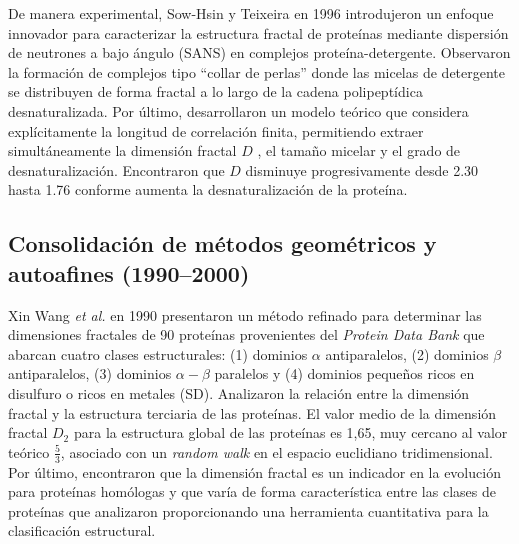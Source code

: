 De manera experimental, Sow-Hsin y Teixeira \cite{Chen1986} en 1996 introdujeron un enfoque innovador para caracterizar la estructura fractal de prote\'{i}nas mediante dispersi\'{o}n de neutrones a bajo \'{a}ngulo (SANS) en complejos prote\'{i}na-detergente. Observaron la formaci\'{o}n de complejos tipo ``collar de perlas'' donde las micelas de detergente se distribuyen de forma fractal a lo largo de la cadena polipept\'{i}dica desnaturalizada. Por \'{u}ltimo, desarrollaron un modelo te\'{o}rico que considera expl\'{i}citamente la longitud de correlaci\'{o}n finita, permitiendo extraer simult\'{a}neamente la dimensi\'{o}n fractal $D$ , el tamaño micelar y el grado de desnaturalizaci\'{o}n. Encontraron que $D$ disminuye progresivamente desde 2.30 hasta 1.76 conforme aumenta la desnaturalizaci\'{o}n de la prote\'{i}na.

\subsection{Consolidaci\'{o}n de m\'{e}todos geom\'{e}tricos y autoafines (1990--2000)}


Xin Wang \textit{et al.} \cite{Wang1990} en 1990 presentaron un m\'{e}todo refinado para determinar las dimensiones fractales de 90 prote\'{i}nas provenientes del \textit{Protein Data Bank} que abarcan cuatro clases estructurales: (1) dominios $\alpha$ antiparalelos, (2) dominios $\beta$ antiparalelos, (3) dominios $\alpha-\beta$ paralelos y (4) dominios pequeños ricos en disulfuro o ricos en metales (SD). Analizaron la relaci\'{o}n entre la dimensi\'{o}n fractal y la estructura terciaria de las prote\'{i}nas. El valor medio de la dimensi\'{o}n fractal $D_{2}$ para la estructura global de las prote\'{i}nas es 1,65, muy cercano al valor te\'{o}rico $\frac{5}{3}$, asociado con un \textit{random walk} en el espacio euclidiano tridimensional. Por \'{u}ltimo, encontraron que la dimensi\'{o}n fractal es un indicador en la evoluci\'{o}n para prote\'{i}nas hom\'{o}logas y que var\'{i}a de forma caracter\'{i}stica entre las clases de prote\'{i}nas que analizaron proporcionando una herramienta cuantitativa para la clasificaci\'{o}n estructural.


